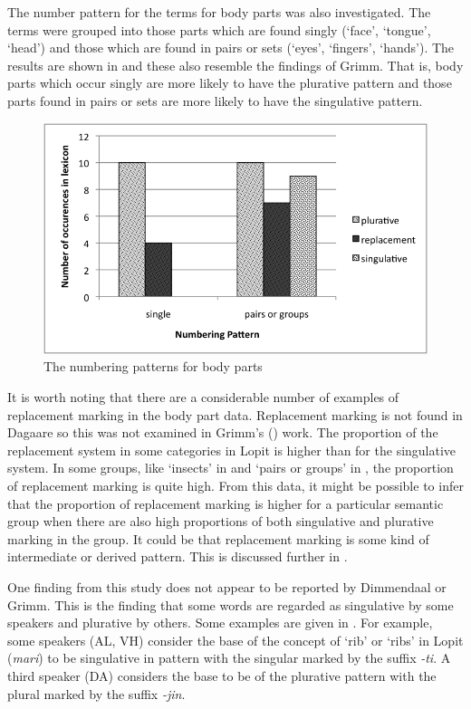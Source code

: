 \documentclass[output=paper]{langsci/langscibook}
\begin{document}
The number pattern for the terms for body parts was also investigated. The terms were grouped into those parts which are found singly (‘face’, ‘tongue’, ‘head’) and those which are found in pairs or sets (‘eyes’, ‘fingers’, ‘hands’). The results are shown in  and these also resemble the findings of Grimm.  That is, body parts which occur singly are more likely to have the plurative pattern and those parts found in pairs or sets are more likely to have the singulative pattern. 

\begin{figure}
\includegraphics[width=\textwidth]{figures/moodie-fig-2.png}
\caption{The numbering patterns for body parts}
\label{fig:moodie:2}
\end{figure}

It is worth noting that there are a considerable number of examples of replacement marking in the body part data. Replacement marking is not found in Dagaare so this was not examined in Grimm’s (\citeyear{Grimm2012}) work. The proportion of the replacement system in some categories in Lopit is higher than for the singulative system.  In some groups, like ‘insects’ in  and  ‘pairs or groups’ in , the proportion of replacement marking is quite high. From this data, it might be possible to infer that the proportion of replacement marking is higher for a particular semantic group when there are also high proportions of both singulative and plurative marking in the group. It could be that replacement marking is some kind of intermediate or derived pattern.  This is discussed further in .

One finding from this study does not appear to be reported by Dimmendaal or Grimm. This is the finding that some words are regarded as singulative by some speakers and plurative by others. Some examples are given in . For example, some speakers (AL, VH) consider the base of the concept of ‘rib’ or ‘ribs’ in Lopit (\textit{mari}) to be singulative in pattern with the singular marked by the suffix \textit{-ti}. A third speaker (DA) considers the base to be of the plurative pattern with the plural marked by the suffix \textit{-jin}. 
\end{document}
